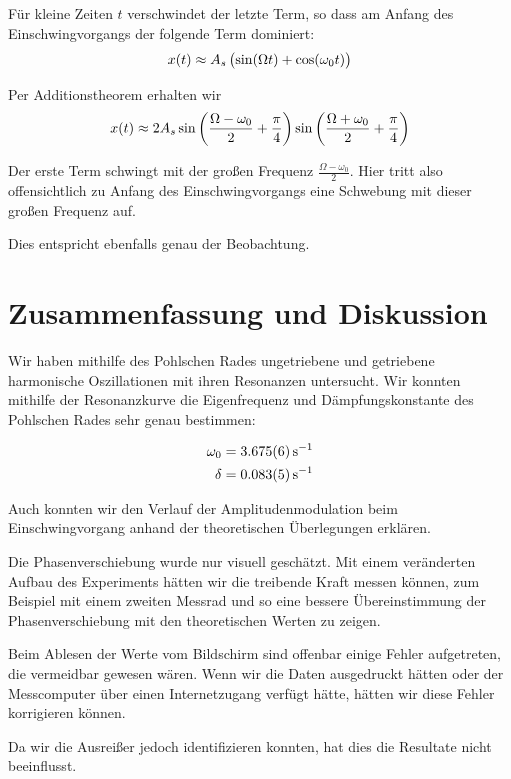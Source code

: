 \documentclass[a4paper,german,12pt,smallheadings]{scrartcl}
\begin{document}
Für kleine Zeiten $t$ verschwindet der letzte Term, so dass am Anfang des
Einschwingvorgangs der folgende Term dominiert:
\begin{equation}
  x(t) \approx A_s \del{\sin(\Omega t) + \cos(\omega_0 t)}
\end{equation}

Per Additionstheorem erhalten wir
\begin{equation}
  x(t) \approx 2 A_s \sin\del{\frac{\Omega - \omega_0}{2} + \frac{\pi}{4}}
  \sin\del{\frac{\Omega + \omega_0}{2} + \frac{\pi}{4}}
\end{equation}

Der erste Term schwingt mit der großen Frequenz $\frac{\Omega - \omega_0}{2}$.
Hier tritt also offensichtlich zu Anfang des Einschwingvorgangs eine Schwebung
mit dieser großen Frequenz auf.

Dies entspricht ebenfalls genau der Beobachtung.

\section{Zusammenfassung und Diskussion}
Wir haben mithilfe des Pohlschen Rades ungetriebene und getriebene harmonische
Oszillationen mit ihren Resonanzen untersucht. Wir konnten mithilfe der
Resonanzkurve die Eigenfrequenz und Dämpfungskonstante des Pohlschen Rades sehr
genau bestimmen:

\begin{align}
  \omega_0 &= \SI{3,675+-0.006}{s^{-1}} \\
  \delta &= \SI{0.083+-0.005}{s^{-1}}
\end{align}

Auch konnten wir den Verlauf der Amplitudenmodulation beim Einschwingvorgang
anhand der theoretischen Überlegungen erklären.

Die Phasenverschiebung wurde nur visuell geschätzt. Mit einem veränderten
Aufbau des Experiments hätten wir die treibende Kraft messen können, zum
Beispiel mit einem zweiten Messrad und so eine bessere Übereinstimmung der
Phasenverschiebung mit den theoretischen Werten zu zeigen.

Beim Ablesen der Werte vom Bildschirm sind offenbar einige Fehler aufgetreten,
die vermeidbar gewesen wären.  Wenn wir die Daten ausgedruckt hätten oder der
Messcomputer über einen Internetzugang verfügt hätte, hätten wir diese Fehler
korrigieren können.

Da wir die Ausreißer jedoch identifizieren konnten, hat dies die Resultate
nicht beeinflusst.

\newpage
\label{plot:damp}
\begin{landscape}
  
\end{landscape}

\newpage
\label{plot:amp}
\begin{landscape}
  
\end{landscape}
\end{document}
